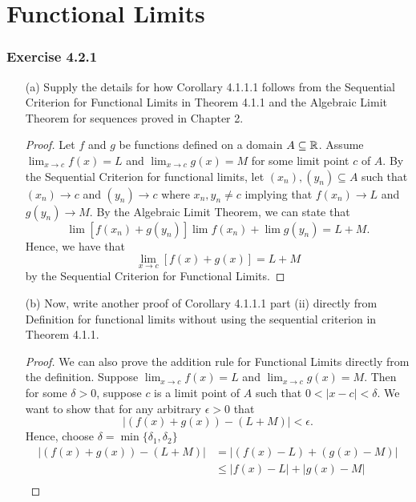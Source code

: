 \section{Functional Limits}


\subsubsection{Exercise 4.2.1}

\begin{enumerate}
    \item[(a)] Supply the details for how Corollary 4.1.1.1 follows from the Sequential Criterion for Functional Limits in Theorem 4.1.1 and the Algebraic Limit Theorem for sequences proved in Chapter 2.

    \begin{proof}
    Let \( f \) and \( g \) be functions defined on a domain \( A \subseteq \mathbb{R}  \). Assume \( \lim_{ x \to c } f(x) = L  \) and \( \lim_{ x \to c } g(x) = M  \) for some limit point \( c  \) of \( A  \). By the Sequential Criterion for functional limits, let \( (x_n), (y_n) \subseteq A  \) such that \( (x_n) \to c  \) and \( (y_n) \to c  \) where \( x_n, y_n \neq c  \) implying that \(f(x_n) \to L   \) and \( g(y_n) \to M  \). By the Algebraic Limit Theorem, we can state that 
    \[  \lim [f(x_n) + g(y_n)]\lim f(x_n) + \lim g(y_n) = L  + M.\]
    Hence, we have that 
    \[  \lim_{ x \to c } [f(x) + g(x)] = L + M  \]
    by the Sequential Criterion for Functional Limits.
    \end{proof}
    \item[(b)] Now, write another proof of Corollary 4.1.1.1 part (ii) directly from Definition for functional limits without using the sequential criterion in Theorem 4.1.1.
    \begin{proof}
    We can also prove the addition rule for Functional Limits directly from the definition. Suppose \( \lim_{ x \to c } f(x) = L  \) and \( \lim_{ x \to c } g(x) = M  \). Then for some \( \delta > 0  \), suppose \( c  \) is a limit point of \( A  \) such that \( 0 < | x -c  | < \delta \). We want to show that for any arbitrary \( \epsilon > 0  \) that 
    \[  | (f(x) + g(x)) - (L + M) | < \epsilon.  \]
    Hence, choose \( \delta = \min \{ \delta_1, \delta_2  \}  \)
    \begin{align*}
        |(f(x) + g(x)) - (L + M)   | &= | (f(x) - L ) + (g(x) - M ) |  \\
       &\leq  | f(x) - L  |  + | g(x) - M  | \\ 

\end{align*}
\end{proof}
\end{enumerate}
